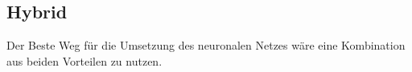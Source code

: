 

\subsection{Hybrid}
Der Beste Weg für die Umsetzung des neuronalen Netzes wäre eine Kombination aus beiden Vorteilen zu nutzen.

